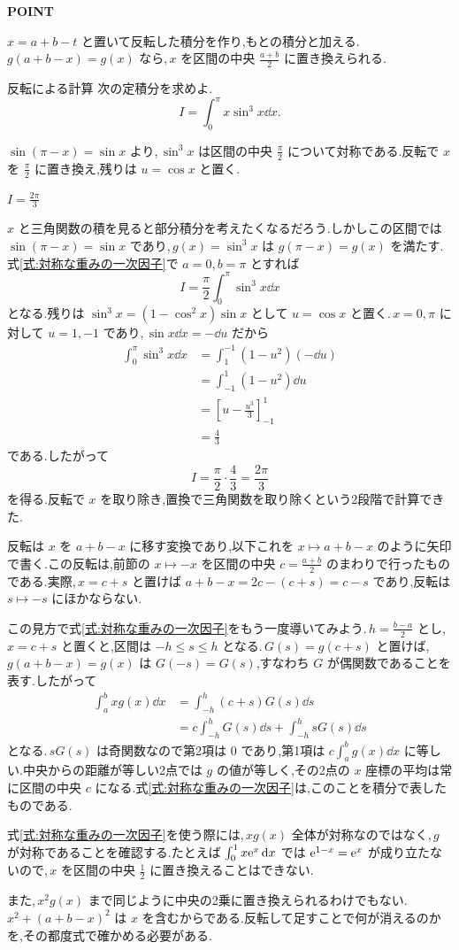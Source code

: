 \begin{bookpoint}
\textbf{POINT}\par
$x=a+b-t$ と置いて反転した積分を作り,もとの積分と加える.\,$g(a+b-x)=g(x)$ なら,\,$x$ を区間の中央 $\frac{a+b}{2}$ に置き換えられる.
\end{bookpoint}

\begin{example}{反転による計算}
次の定積分を求めよ.
\[
I=\int_0^\pi x\sin^3x\dd x.
\]
\end{example}

$\sin(\pi-x)=\sin x$ より,\,$\sin^3x$ は区間の中央 $\frac{\pi}{2}$ について対称である.反転で $x$ を $\frac{\pi}{2}$ に置き換え,残りは $u=\cos x$ と置く.

$I=\frac{2\pi}{3}$

$x$ と三角関数の積を見ると部分積分を考えたくなるだろう.しかしこの区間では $\sin(\pi-x)=\sin x$ であり,\,$g(x)=\sin^3x$ は $g(\pi-x)=g(x)$ を満たす.式\eqref{式:対称な重みの一次因子}で $a=0$,\,$b=\pi$ とすれば
\[
I=\frac{\pi}{2}\int_0^\pi\sin^3x\dd x
\]
となる.残りは $\sin^3x=(1-\cos^2x)\sin x$ として $u=\cos x$ と置く.\,$x=0,\pi$ に対して $u=1,-1$ であり,\,$\sin x\dd x=-\dd u$ だから
\[
\begin{aligned}
\int_0^\pi\sin^3x\dd x
 &=\int_1^{-1}(1-u^2)(-\dd u)\\
 &=\int_{-1}^1(1-u^2)\dd u\\
 &=\left[u-\frac{u^3}{3}\right]_{-1}^1\\
 &=\frac43
\end{aligned}
\]
である.したがって
\[
I=\frac{\pi}{2}\cdot\frac43=\frac{2\pi}{3}
\]
を得る.反転で $x$ を取り除き,置換で三角関数を取り除くという2段階で計算できた.

反転は $x$ を $a+b-x$ に移す変換であり,以下これを $x\mapsto a+b-x$ のように矢印で書く.この反転は,前節の $x\mapsto-x$ を区間の中央 $c=\frac{a+b}{2}$ のまわりで行ったものである.実際,\,$x=c+s$ と置けば $a+b-x=2c-(c+s)=c-s$ であり,反転は $s\mapsto-s$ にほかならない.

この見方で式\eqref{式:対称な重みの一次因子}をもう一度導いてみよう.\,$h=\frac{b-a}{2}$ とし,\,$x=c+s$ と置くと,区間は $-h\le s\le h$ となる.\,$G(s)=g(c+s)$ と置けば,\,$g(a+b-x)=g(x)$ は $G(-s)=G(s)$,すなわち $G$ が偶関数であることを表す.したがって
\[
\begin{aligned}
\int_a^b xg(x)\dd x
 &=\int_{-h}^h(c+s)G(s)\dd s\\
 &=c\int_{-h}^hG(s)\dd s+\int_{-h}^h sG(s)\dd s
\end{aligned}
\]
となる.\,$sG(s)$ は奇関数なので第2項は $0$ であり,第1項は $c\int_a^b g(x)\dd x$ に等しい.中央からの距離が等しい2点では $g$ の値が等しく,その2点の $x$ 座標の平均は常に区間の中央 $c$ になる.式\eqref{式:対称な重みの一次因子}は,このことを積分で表したものである.

式\eqref{式:対称な重みの一次因子}を使う際には,\,$xg(x)$ 全体が対称なのではなく,\,$g$ が対称であることを確認する.たとえば $\int_0^1 x\mathrm{e}^x\,\mathrm{d} x$ では $\mathrm{e}^{1-x}=\mathrm{e}^x$ が成り立たないので,\,$x$ を区間の中央 $\frac12$ に置き換えることはできない.

また,\,$x^2g(x)$ まで同じように中央の2乗に置き換えられるわけでもない.\,$x^2+(a+b-x)^2$ は $x$ を含むからである.反転して足すことで何が消えるのかを,その都度式で確かめる必要がある.
